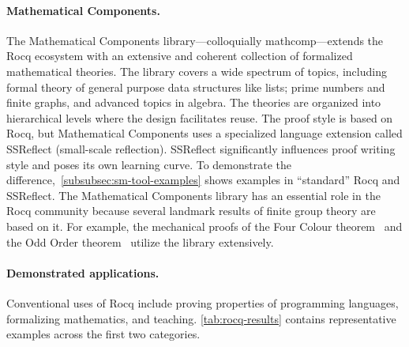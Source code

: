 \paragraph*{Mathematical Components.}
The Mathematical Components library---colloquially mathcomp---extends the Rocq ecosystem with an extensive and coherent collection of formalized mathematical theories.
The library covers a wide spectrum of topics, including formal theory of general purpose data structures like lists;
prime numbers and finite graphs, and advanced topics in algebra.
The theories are organized into hierarchical levels where the design facilitates reuse.
The proof style is based on Rocq, but Mathematical Components uses a specialized language extension called SSReflect (small-scale reflection).
SSReflect significantly influences proof writing style and poses its own learning curve.
To demonstrate the difference,~\autoref{subsubsec:sm-tool-examples} shows examples in \enquote{standard} Rocq and SSReflect.
The Mathematical Components library has an essential role in the Rocq community because several landmark results of finite group theory are based on it.
For example, the mechanical proofs of the Four Colour theorem~\cite{gonthier2008} and the Odd Order theorem~\cite{gonthier2013} utilize the library extensively.

\paragraph*{Demonstrated applications.}
Conventional uses of Rocq include proving properties of programming languages, formalizing mathematics, and teaching.
\autoref{tab:rocq-results} contains representative examples across the first two categories.

